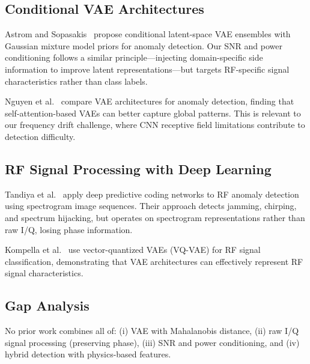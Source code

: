 \documentclass[conference]{IEEEtran}
\begin{document}
\subsection{Conditional VAE Architectures}
Astrom and Sopasakis~\cite{astrom2024} propose conditional latent-space VAE ensembles with Gaussian mixture model priors for anomaly detection. Our SNR and power conditioning follows a similar principle---injecting domain-specific side information to improve latent representations---but targets RF-specific signal characteristics rather than class labels.

Nguyen et al.~\cite{} compare VAE architectures for anomaly detection, finding that self-attention-based VAEs can better capture global patterns. This is relevant to our frequency drift challenge, where CNN receptive field limitations contribute to detection difficulty.

\subsection{RF Signal Processing with Deep Learning}
Tandiya et al.~\cite{tandiya2018} apply deep predictive coding networks to RF anomaly detection using spectrogram image sequences. Their approach detects jamming, chirping, and spectrum hijacking, but operates on spectrogram representations rather than raw I/Q, losing phase information.

Kompella et al.~\cite{kompella2024} use vector-quantized VAEs (VQ-VAE) for RF signal classification, demonstrating that VAE architectures can effectively represent RF signal characteristics.

\subsection{Gap Analysis}
No prior work combines all of: (i) VAE with Mahalanobis distance, (ii) raw I/Q signal processing (preserving phase), (iii) SNR and power conditioning, and (iv) hybrid detection with physics-based features.

\begin{table}[t]
\caption{Comparison with related work.}
\label{tab:related}
\centering
{}
\end{table}
\end{document}
